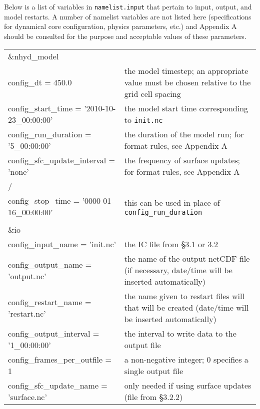 Below is a list of variables in {\tt namelist.input} that pertain to input, output, and model restarts.  A number of namelist variables are not listed here (specifications for dynamical core configuration, physics parameters, etc.) and Appendix A should be consulted for the purpose and acceptable values of these parameters.

\begin{longtable}{p{3.0in} |p{3.25in}}

\&nhyd\_model                                        & \\
   config\_dt = 450.0                                & the model timestep; an appropriate value must be chosen relative to the grid cell spacing \\
   config\_start\_time = '2010-10-23\_00:00:00'      & the model start time corresponding to {\tt init.nc}\\
   config\_run\_duration = '5\_00:00:00'             & the duration of the model run; for format rules, see Appendix A \\
   config\_sfc\_update\_interval = 'none'            & the frequency of surface updates; for format rules, see Appendix A \\
/                                                    & \\
   config\_stop\_time  = '0000-01-16\_00:00:00'      & this can be used in place of {\tt config\_run\_duration} \\
                                                     & \\
\&io                                                 & \\
   config\_input\_name = 'init.nc'                   & the IC file from \S 3.1 or 3.2 \\
   config\_output\_name = 'output.nc'                & the name of the output netCDF file (if necessary, date/time will be inserted automatically) \\
   config\_restart\_name = 'restart.nc'              & the name given to restart files will that will be created (date/time will be inserted automatically) \\
   config\_output\_interval = '1\_00:00:00'          & the interval to write data to the output file\\
   config\_frames\_per\_outfile = 1                  & a non-negative integer; 0 specifies a single output file \\
   config\_sfc\_update\_name = 'surface.nc'          & only needed if using surface updates (file from \S 3.2.2) \\

\end{longtable}
